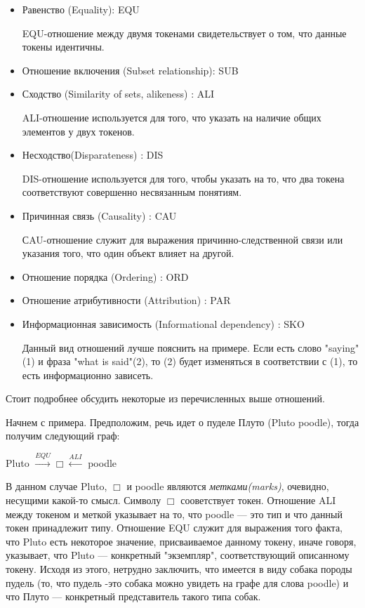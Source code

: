\begin{itemize}

\item{
Равенство (Equality): EQU

EQU-отношение между двумя токенами свидетельствует о том, 
что данные токены идентичны.
}

\item {
Отношение включения (Subset relationship): SUB

}

\item{
Сходство (Similarity of sets, alikeness) : ALI

ALI-отношение используется для того, что указать на наличие общих
элементов у двух токенов.
}

\item{
Несходство(Disparateness) : DIS

DIS-отношение используется для того, чтобы указать на то, что
два токена соответствуют совершенно несвязанным понятиям.
}

\item{
Причинная связь (Causality) : CAU

СAU-отношение служит для выражения причинно-следственной связи или
указания того, что один объект влияет на другой. 
}

\item{
Отношение порядка (Ordering) : ORD  
}

\item{
Отношение атрибутивности (Attribution) : PAR
}

\item{
Информационная зависимость (Informational dependency) : SKO

Данный вид отношений лучше пояснить на примере. Если есть слово "saying"(1)
и фраза "what is said"(2), то (2) будет изменяться в соответствии с (1), то есть
информационно зависеть.
}
\end{itemize}

Стоит подробнее обсудить некоторые из перечисленных выше отношений. 

Начнем с примера. Предположим, речь идет о пуделе Плуто (Pluto poodle),
 тогда получим следующий граф:

Pluto $\xrightarrow{EQU} \Box \xleftarrow{ALI}$ poodle 

В данном случае Pluto, $\Box$ и poodle являются \textsl{метками(marks)}, очевидно, несущими 
какой-то смысл. Символу $\Box$ сооветствует токен. Отношение ALI между токеном и меткой указывает
на то, что poodle --- это тип и что данный токен принадлежит типу. Отношение EQU служит для выражения
того факта, что Pluto есть некоторое значение, присваиваемое данному токену, иначе говоря, указывает,
что Pluto --- конкретный "экземпляр", соответствующий описанному токену. Исходя из этого, нетрудно заключить,
что имеется в виду собака породы пудель (то, что пудель -это собака можно увидеть на графе для слова
 poodle) и что Плуто --- конкретный представитель такого типа собак.

